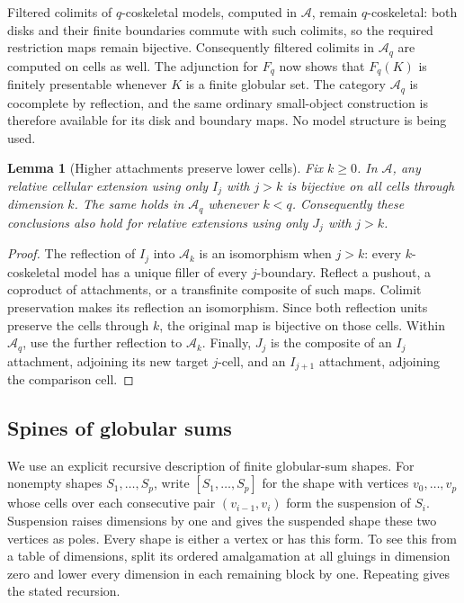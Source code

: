 \documentclass[11pt,letterpaper]{article}
\numberwithin{equation}{section}
\theoremstyle{plain}
\newtheorem{lemma}[theorem]{Lemma}
\theoremstyle{definition}
\theoremstyle{remark}
\begin{document}
Filtered colimits of $q$-coskeletal models, computed in
$\mathcal A$, remain $q$-coskeletal: both disks and their finite
boundaries commute with such colimits, so the required restriction
maps remain bijective.  Consequently filtered colimits in
$\mathcal A_q$ are computed on cells as well.  The adjunction for
$F_q$ now shows that $F_q(K)$ is finitely presentable whenever $K$
is a finite globular set.  The category $\mathcal A_q$ is
cocomplete by reflection, and the same ordinary small-object
construction is therefore available for its disk and boundary
maps.  No model structure is being used.

\begin{lemma}[Higher attachments preserve lower cells]
\label{lem:high-cells}
Fix $k\geq0$.  In $\mathcal A$, any relative cellular extension using
only $I_j$ with $j>k$ is bijective on all cells through dimension $k$.
The same holds in $\mathcal A_q$ whenever $k<q$.  Consequently these
conclusions also hold for relative extensions using only $J_j$
with $j>k$.
\end{lemma}

\begin{proof}
The reflection of $I_j$ into $\mathcal A_k$ is an isomorphism when
$j>k$: every $k$-coskeletal model has a unique filler of every
$j$-boundary.  Reflect a pushout, a coproduct of attachments, or a
transfinite composite of such maps.  Colimit preservation makes its
reflection an isomorphism.  Since both reflection units preserve
the cells through $k$, the original map is bijective on those cells.
Within $\mathcal A_q$, use the further reflection to $\mathcal A_k$.
Finally, $J_j$ is the composite of an $I_j$ attachment, adjoining its
new target $j$-cell, and an $I_{j+1}$ attachment, adjoining the
comparison cell.
\end{proof}

\subsection{Spines of globular sums}

We use an explicit recursive description of finite globular-sum
shapes.  For nonempty shapes $S_1,\ldots,S_p$, write
$[S_1,\ldots,S_p]$ for the shape with vertices
$v_0,\ldots,v_p$ whose cells over each consecutive pair
$(v_{i-1},v_i)$ form the suspension of $S_i$.  Suspension raises
dimensions by one and gives the suspended shape these two vertices
as poles.  Every shape is either a vertex or has this form.  To see
this from a table of dimensions, split its ordered amalgamation at
all gluings in dimension zero and lower every dimension in each
remaining block by one.  Repeating gives the stated recursion.
\end{document}
